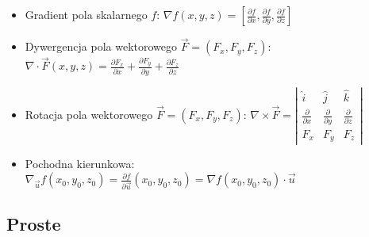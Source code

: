 \documentclass[10pt, twoside, fleqn]{article}
\begin{document}
		\begin{itemize}
			\item	Gradient pola skalarnego $f$:  \hspace{10pt} 
					$\displaystyle	
						\nabla f(x,y,z) = 
						\left[ 	\frac{\partial f}{\partial x},
								\frac{\partial f}{\partial y},
								\frac{\partial f}{\partial z}   \right] $

			\item	Dywergencja pola wektorowego 
					$\vec{F}=(F_x,F_y,F_z)$:  \hspace{10pt} 
					$\displaystyle	
						\nabla \cdot \vec{F}(x,y,z) = 
							\frac{\partial F_x}{\partial x}
						  + \frac{\partial F_y}{\partial y}
						  + \frac{\partial F_z}{\partial z}  $

			\item	Rotacja pola wektorowego
					$\vec{F}=(F_x,F_y,F_z)$:  \hspace{10pt}
				$ \nabla \times \vec{F}= 
					\left| 
					\begin{array}{ccc}
						\hat{i} & \hat{j} & \hat{k} \\
							\frac{\partial}{\partial x} & \frac{\partial}{\partial y} &	\frac{\partial}{\partial z} \\	
						F_x & F_y & F_z 
					\end{array} 
					\right|	
				$	
				
			\item	Pochodna kierunkowa:  \hspace{10pt} 
					$\displaystyle	
						\nabla_{\vec{u}} f(x_0,y_0,z_0) =
							\frac{\partial f}{\partial \vec{u}} (x_0,y_0,z_0) =
							\nabla f(x_0,y_0,z_0) \cdot \vec{u}	 $
		
				
		
		\end{itemize}

			


\vspace{30pt}


\subsection{Proste}
\end{document}

